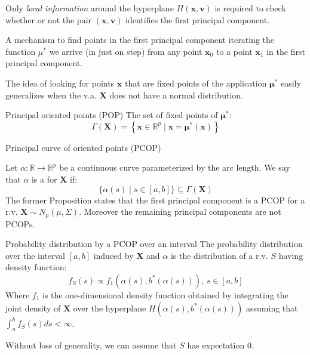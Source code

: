 Only \emph{local information} around the hyperplane $H(\boldsymbol x, \boldsymbol v)$ is required
to check whether or not the pair $(\boldsymbol x, \boldsymbol v)$ identifies the first principal
component.

A mechanism to find points in the first principal component iterating the function
$\mu^*$ we arrive (in just on step) from any point
$\boldsymbol x_0$ to a point $\boldsymbol x_1$ in the first principal component.

The idea of looking for points $\boldsymbol x$ that are fixed points of the application
$\boldsymbol \mu^*$ easily generalizes when the v.a. $\boldsymbol X$ does not have a normal
distribution.

\begin{definition}{Principal oriented points (POP)}{}
	The set of fixed points of $\boldsymbol \mu^*$:
	\begin{equation*}
		\Gamma(\boldsymbol X) = \left\{
		\boldsymbol x \in \mathds{R}^p \mid \boldsymbol x = \boldsymbol \mu^*(\boldsymbol x)
		\right\}
	\end{equation*}
\end{definition}

\begin{definition}{Principal curve of oriented points (PCOP)}{}

	Let $\alpha : \mathds{R} \to \mathds{R}^p$ be a continuous curve parameterized by the arc length.
	We say that $\alpha$ is a  for $\boldsymbol X$ if:
	\begin{equation*}
		\{
		\alpha(s) \mid s \in [a, b]
		\} \subseteq \Gamma(\boldsymbol X)
	\end{equation*}
	\tcblower
	The former Proposition states that the first principal component is a PCOP
	for a r.v. $\boldsymbol X \sim N_p(\mu, \Sigma)$. Moreover the remaining principal
	components are not PCOPs.
\end{definition}

\begin{definition}{Probability distribution by a PCOP over an interval}{}
	The probability distribution over the interval $[a, b]$ induced by $\boldsymbol X$ and $\alpha$
	is the distribution of a r.v. $S$ having density function:
	\begin{equation*}
		f_S(s) \propto f_1(\alpha(s), b^*(\alpha(s))),\,s\in[a, b]
	\end{equation*}
	\tcblower
	Where $f_1$ is the one-dimensional density function obtained by integrating
	the joint density of $\boldsymbol X$ over the hyperplane $H(\alpha(s), b^*(\alpha(s)))$
	assuming that $\int_a^b f_S(s) ds < \infty$.

	Without loss of generality, we can assume that $S$ has expectation 0.
\end{definition}

